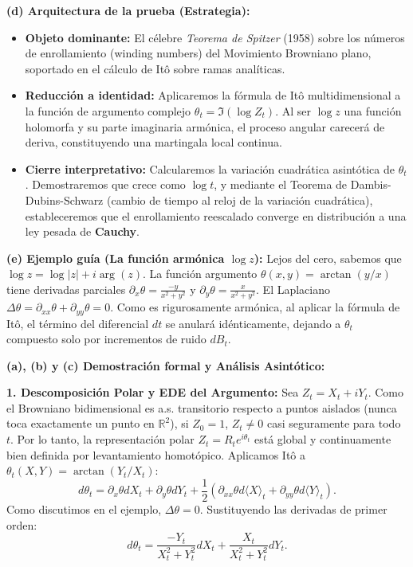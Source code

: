 \documentclass[11pt, letterpaper]{article}
\begin{document}
\begin{solucion}
    \textbf{(d) Arquitectura de la prueba (Estrategia):}
    \begin{itemize}
        \item[(i)] \textbf{Objeto dominante:} El célebre \textit{Teorema de Spitzer} (1958) sobre los números de enrollamiento (winding numbers) del Movimiento Browniano plano, soportado en el cálculo de Itô sobre ramas analíticas.
        \item[(ii)] \textbf{Reducción a identidad:} Aplicaremos la fórmula de Itô multidimensional a la función de argumento complejo $\theta_t = \Im(\log Z_t)$. Al ser $\log z$ una función holomorfa y su parte imaginaria armónica, el proceso angular carecerá de deriva, constituyendo una martingala local continua.
        \item[(iii)] \textbf{Cierre interpretativo:} Calcularemos la variación cuadrática asintótica de $\theta_t$. Demostraremos que crece como $\log t$, y mediante el Teorema de Dambis-Dubins-Schwarz (cambio de tiempo al reloj de la variación cuadrática), estableceremos que el enrollamiento reescalado converge en distribución a una ley pesada de \textbf{Cauchy}.
    \end{itemize}

    \vspace{3mm}
    \textbf{(e) Ejemplo guía (La función armónica $\log z$):}
    Lejos del cero, sabemos que $\log z = \log |z| + i \arg(z)$. La función argumento $\theta(x,y) = \arctan(y/x)$ tiene derivadas parciales $\partial_x \theta = \frac{-y}{x^2+y^2}$ y $\partial_y \theta = \frac{x}{x^2+y^2}$.
    El Laplaciano $\Delta \theta = \partial_{xx}\theta + \partial_{yy}\theta = 0$. Como es rigurosamente armónica, al aplicar la fórmula de Itô, el término del diferencial $dt$ se anulará idénticamente, dejando a $\theta_t$ compuesto solo por incrementos de ruido $dB_t$.

    \textbf{(a), (b) y (c) Demostración formal y Análisis Asintótico:}

    \textbf{1. Descomposición Polar y EDE del Argumento:}
    Sea $Z_t = X_t + i Y_t$. Como el Browniano bidimensional es a.s. transitorio respecto a puntos aislados (nunca toca exactamente un punto en $\mathbb{R}^2$), si $Z_0=1$, $Z_t \neq 0$ casi seguramente para todo $t$.
    Por lo tanto, la representación polar $Z_t = R_t e^{i\theta_t}$ está global y continuamente bien definida por levantamiento homotópico.
    Aplicamos Itô a $\theta_t(X, Y) = \arctan(Y_t / X_t)$:
    \[ d\theta_t = \partial_x \theta dX_t + \partial_y \theta dY_t + \frac{1}{2}(\partial_{xx}\theta d\langle X \rangle_t + \partial_{yy}\theta d\langle Y \rangle_t). \]
    Como discutimos en el ejemplo, $\Delta \theta = 0$. Sustituyendo las derivadas de primer orden:
    \[ d\theta_t = \frac{-Y_t}{X_t^2+Y_t^2} dX_t + \frac{X_t}{X_t^2+Y_t^2} dY_t. \]


\end{solucion}
\end{document}
